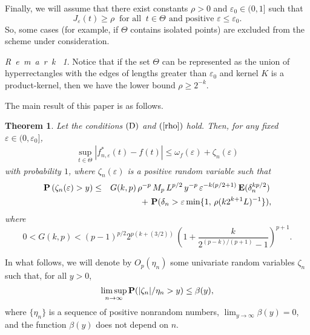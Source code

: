 \documentclass[12pt]{article}
\theoremstyle{remark}
\newtheorem{rem}
{R~e~m~a~r~k~}
\begin{document}
Finally,  we will assume that there exist constants $\rho>0$ and $\varepsilon_0\in (0,1]$ such that
\begin{equation}\label{rho}
J_{\varepsilon}(t)\ge \rho\ \mbox{ for all }\ t\in\Theta\,\  \mbox{and positive}\,\,\varepsilon \le\varepsilon_0.
\end{equation}
So, some cases (for example, if
$\Theta$ contains isolated points) are excluded from the scheme under consideration.

 \begin{rem}
 Notice that if the set $\Theta$ can be represented as the union of hyperrectangles with the edges of lengths greater than $\varepsilon_0$ and kernel $K$ is a product-kernel, then we have the lower bound $\rho \ge 2^{-k}$.
\end{rem}


The main result of this paper is as follows.

{\bf Theorem 1}. {\it Let the conditions $(\rm D)$ and  $(\ref{rho})$ hold. Then, for any fixed $\varepsilon\in (0,\varepsilon_0]$,
\begin{eqnarray}\label{T12}
\sup_{t\in \Theta}|f^*_{n,\varepsilon}(t)-f(t)|\le \omega_f(\varepsilon)
+\zeta_n(\varepsilon)
\end{eqnarray}
 with probability $1$, where $\zeta_n(\varepsilon)$ is a positive random variable such that
\begin{eqnarray}
{\bf P}\left( \zeta_n(\varepsilon)>y\right)&\le&
G(k,p)\, \rho^{-p}\, M_p\, L^{p/2}\, y^{-p}
\,\varepsilon^{-k(p/2+1)}\,{\bf E}(\delta_n^{kp/2})\,
\notag \\
&&
\label{rest2}
+\ {\bf P}(\delta_n>\varepsilon
\min\{1,\, \rho(k2^{k+1} L)^{-1}\}),
\end{eqnarray}
where
$$0<G(k,p)< (p-1)^{p/2} 2^{p(k+(3/2))}
\,
\left( 1
+\frac{k}{2^{(p-k)/(p+1)} - 1}
\right)^{p+1}.
$$
}



In what follows, we will denote by
    $O_p(\eta_n)$ some  univariate random variables $\zeta_n$ such that, for all $y>0$,
   $$\limsup_{n\to\infty} {\bf P}(|\zeta_n|/\eta_n>y)\le \beta(y),
   $$
where  $\{\eta_n\}$ is a sequence of positive nonrandom numbers, $\lim_{y\to\infty}\beta(y)=0$, and the function $\beta(y)$ does not depend on $n$.
\end{document}
